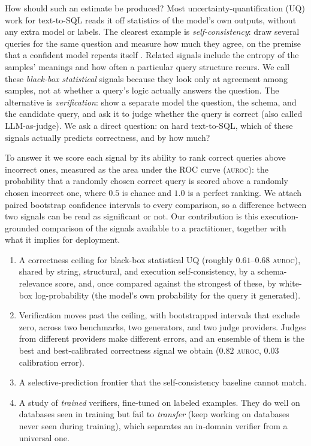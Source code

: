 \documentclass[11pt]{article}
\newcommand{\auroc}{\textsc{auroc}}
\begin{document}
How should such an estimate be produced? Most uncertainty-quantification (UQ) work for text-to-SQL
reads it off statistics of the model's own outputs, without any extra model or labels. The clearest
example is \emph{self-consistency}: draw several queries for the same question and measure how much
they agree, on the premise that a confident model repeats itself \citep{wang2023selfconsistency}.
Related signals include the entropy of the samples' meanings \citep{kuhn2023semantic,farquhar2024semantic}
and how often a particular query structure recurs. We call these \emph{black-box statistical} signals
because they look only at agreement among samples, not at whether a query's logic actually answers the
question. The alternative is \emph{verification}: show a separate model the question, the schema, and
the candidate query, and ask it to judge whether the query is correct (also called LLM-as-judge). We
ask a direct question: on hard text-to-SQL, which of these signals actually predicts correctness, and
by how much?

To answer it we score each signal by its ability to rank correct queries above incorrect ones,
measured as the area under the ROC curve (\auroc{}): the probability that a randomly chosen correct
query is scored above a randomly chosen incorrect one, where $0.5$ is chance and $1.0$ is a perfect
ranking. We attach paired bootstrap confidence intervals to every comparison, so a difference between
two signals can be read as significant or not. Our contribution is this execution-grounded comparison
of the signals available to a practitioner, together with what it implies for deployment.
\begin{enumerate}
\item A correctness ceiling for black-box statistical UQ (roughly $0.61$--$0.68$ \auroc{}), shared by
string, structural, and execution self-consistency, by a schema-relevance score, and, once compared
against the strongest of these, by white-box log-probability (the model's own probability for the
query it generated).
\item Verification moves past the ceiling, with bootstrapped intervals that exclude zero, across two
benchmarks, two generators, and two judge providers. Judges from different providers make different
errors, and an ensemble of them is the best and best-calibrated correctness signal we obtain ($0.82$
\auroc{}, $0.03$ calibration error).
\item A selective-prediction frontier that the self-consistency baseline cannot match.
\item A study of \emph{trained} verifiers, fine-tuned on labeled examples. They do well on databases
seen in training but fail to \emph{transfer} (keep working on databases never seen during training),
which separates an in-domain verifier from a universal one.
\end{enumerate}
\end{document}
